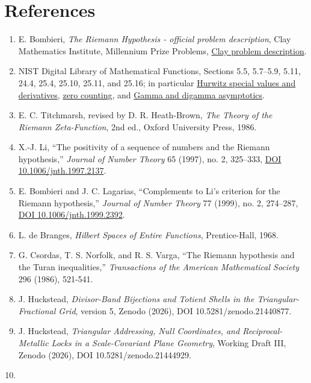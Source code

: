 \documentclass[
  11pt,
]{book}
\begin{document}
\chapter{References}\label{references}

\begingroup
\small

\begin{enumerate}
\def\labelenumi{\arabic{enumi}.}
\item
  E. Bombieri, \emph{The Riemann Hypothesis - official problem
  description}, Clay Mathematics Institute, Millennium Prize Problems,
  \href{https://www.claymath.org/millennium/riemann-hypothesis/}{Clay
  problem description}.
\item
  NIST Digital Library of Mathematical Functions, Sections 5.5,
  5.7--5.9, 5.11, 24.4, 25.4, 25.10, 25.11, and 25.16; in particular
  \href{https://dlmf.nist.gov/25.11}{Hurwitz special values and
  derivatives}, \href{https://dlmf.nist.gov/25.10}{zero counting}, and
  \href{https://dlmf.nist.gov/5.11}{Gamma and digamma asymptotics}.
\item
  E. C. Titchmarsh, revised by D. R. Heath-Brown, \emph{The Theory of
  the Riemann Zeta-Function}, 2nd ed., Oxford University Press, 1986.
\item
  X.-J. Li, ``The positivity of a sequence of numbers and the Riemann
  hypothesis,'' \emph{Journal of Number Theory} 65 (1997), no. 2,
  325--333, \href{https://doi.org/10.1006/jnth.1997.2137}{DOI
  10.1006/jnth.1997.2137}.
\item
  E. Bombieri and J. C. Lagarias, ``Complements to Li's criterion for
  the Riemann hypothesis,'' \emph{Journal of Number Theory} 77 (1999),
  no. 2, 274--287, \href{https://doi.org/10.1006/jnth.1999.2392}{DOI
  10.1006/jnth.1999.2392}.
\item
  L. de Branges, \emph{Hilbert Spaces of Entire Functions},
  Prentice-Hall, 1968.
\item
  G. Csordas, T. S. Norfolk, and R. S. Varga, ``The Riemann hypothesis
  and the Turan inequalities,'' \emph{Transactions of the American
  Mathematical Society} 296 (1986), 521-541.
\item
  J. Huckstead, \emph{Divisor-Band Bijections and Totient Shells in the
  Triangular-Fractional Grid}, version 5, Zenodo (2026), DOI
  10.5281/zenodo.21440877.
\item
  J. Huckstead, \emph{Triangular Addressing, Null Coordinates, and
  Reciprocal-Metallic Locks in a Scale-Covariant Plane Geometry},
  Working Draft III, Zenodo (2026), DOI 10.5281/zenodo.21444929.
\item

\end{enumerate}
\end{document}
